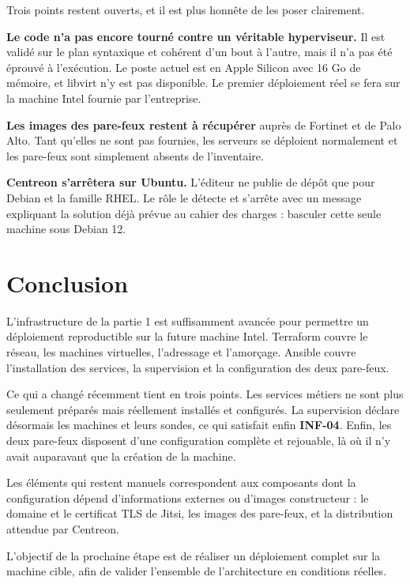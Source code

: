 \documentclass[11pt,a4paper]{article}
\newcommand{\rid}[1]{\textcolor{primary}{\textbf{\small #1}}}
\begin{document}
Trois points restent ouverts, et il est plus honnête de les poser clairement.

\textbf{Le code n'a pas encore tourné contre un véritable hyperviseur.} Il est
validé sur le plan syntaxique et cohérent d'un bout à l'autre, mais il n'a pas
été éprouvé à l'exécution. Le poste actuel est en Apple Silicon avec 16 Go de
mémoire, et libvirt n'y est pas disponible. Le premier déploiement réel se fera
sur la machine Intel fournie par l'entreprise.

\textbf{Les images des pare-feux restent à récupérer} auprès de Fortinet et de
Palo Alto. Tant qu'elles ne sont pas fournies, les serveurs se déploient
normalement et les pare-feux sont simplement absents de l'inventaire.

\textbf{Centreon s'arrêtera sur Ubuntu.} L'éditeur ne publie de dépôt que pour
Debian et la famille RHEL. Le rôle le détecte et s'arrête avec un message
expliquant la solution déjà prévue au cahier des charges : basculer cette seule
machine sous Debian 12.

\section{Conclusion}

L'infrastructure de la partie 1 est suffisamment avancée pour permettre un
déploiement reproductible sur la future machine Intel. Terraform couvre le
réseau, les machines virtuelles, l'adressage et l'amorçage. Ansible couvre
l'installation des services, la supervision et la configuration des deux
pare-feux.

Ce qui a changé récemment tient en trois points. Les services métiers ne sont
plus seulement préparés mais réellement installés et configurés. La supervision
déclare désormais les machines et leurs sondes, ce qui satisfait enfin
\rid{INF-04}. Enfin, les deux pare-feux disposent d'une configuration complète
et rejouable, là où il n'y avait auparavant que la création de la machine.

Les éléments qui restent manuels correspondent aux composants dont la
configuration dépend d'informations externes ou d'images constructeur : le
domaine et le certificat TLS de Jitsi, les images des pare-feux, et la
distribution attendue par Centreon.

L'objectif de la prochaine étape est de réaliser un déploiement complet sur la
machine cible, afin de valider l'ensemble de l'architecture en conditions
réelles.
\end{document}
